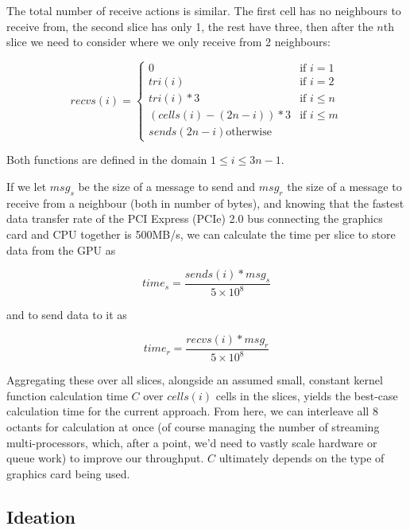 \documentclass[conference]{IEEEtran}
\begin{document}
The total number of receive actions is similar. The first cell has no neighbours to receive from, the second slice has only 1, the rest have three, then after the $n$th slice we need to consider where we only receive from 2 neighbours:

\begin{equation}
recvs(i) = \left\{
	\begin{array}{ll}
		0 & \mbox{if } i = 1 \\
		tri(i) & \mbox{if } i = 2 \\
		tri(i) * 3 & \mbox{if } i \le n \\
		(cells(i) - (2n - i)) * 3 & \mbox{if } i \le m \\
		sends(2n - i) \mbox{otherwise}
	\end{array}
\right.
\end{equation}

Both functions are defined in the domain $ 1 \le i \le 3n - 1 $.

If we let $ msg_s $ be the size of a message to send and $ msg_r $ the size of a message to receive from a neighbour (both in number of bytes), and knowing that the fastest data transfer rate of the PCI Express (PCIe) 2.0 bus connecting the graphics card and CPU together is 500MB/s\cite{PCIe}, we can calculate the time per slice to store data from the GPU as

\begin{equation}
time_s = \frac{sends(i) * msg_s}{5 \times 10^8}
\end{equation}

and to send data to it as

\begin{equation}
time_r = \frac{recvs(i) * msg_r}{5 \times 10^8}
\end{equation}

Aggregating these over all slices, alongside an assumed small, constant kernel function calculation time $ C $ over $ cells(i) $ cells in the slices, yields the best-case calculation time for the current approach. From here, we can interleave all 8 octants for calculation at once (of course managing the number of streaming multi-processors, which, after a point, we'd need to vastly scale hardware or queue work) to improve our throughput. $C$ ultimately depends on the type of graphics card being used.

\subsection{Ideation}
\end{document}
